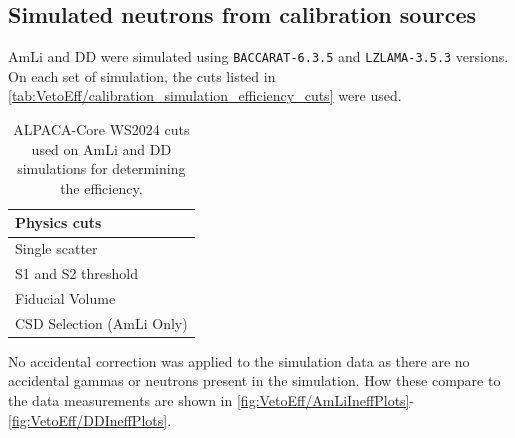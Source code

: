 \subsection{Simulated neutrons from calibration sources}
AmLi and DD were simulated using \lstinline{BACCARAT-6.3.5} and \lstinline{LZLAMA-3.5.3} versions.
On each set of simulation, the cuts listed in \autoref{tab:VetoEff/calibration_simulation_efficiency_cuts} were used.
\begin{table}[!ht]
	\centering
	\caption{ALPACA-Core WS2024 cuts used on AmLi and DD simulations for determining the efficiency.}
	\begin{tabular}{l}
        \hline\hline
        \textbf{Physics cuts}              \\
        \hline
        Single scatter            \\
        S1 and S2 threshold       \\
        Fiducial Volume           \\
        CSD Selection (AmLi Only) \\
        \hline\hline
	\end{tabular}
	\label{tab:VetoEff/calibration_simulation_efficiency_cuts}
\end{table}
No accidental correction was applied to the simulation data as there are no accidental gammas or neutrons present in the simulation.
How these compare to the data measurements are shown in \autoref{fig:VetoEff/AmLiIneffPlots}-\ref{fig:VetoEff/DDIneffPlots}.
